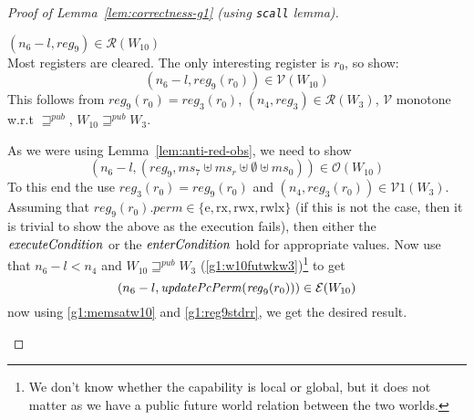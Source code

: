 \documentclass[a4paper]{article}
\newcommand{\var}[1]{\mathit{#1}}
\newcommand{\hs}{\var{ms}}
\newcommand{\ms}{\hs}
\newcommand{\reg}{\var{reg}}
\newcommand{\perm}{\var{perm}}
\newcommand{\plainfun}[2]{
  \ifthenelse{\equal{#2}{}}
  {\mathit{#1}}
  {\mathit{#1}(#2)}
}
\newcommand{\updatePcPerm}[1]{\plainfun{updatePcPerm}{#1}}
\newcommand{\execCond}[1]{\plainfun{executeCondition}{#1}}
\newcommand{\entryCond}[1]{\plainfun{enterCondition}{#1}}
\newcommand{\futurewk}{\mathbin{\sqsupseteq}^{\var{pub}}}
\newcommand{\asmType}{\plaindom{AsmType}}
\newcommand{\plaindom}[1]{\mathrm{#1}}
\newcommand{\intr}[2]{\mathcal{#1}}
\newcommand{\valueintr}[1]{\intr{V}{#1}}
\newcommand{\exprintr}[1]{\intr{E}{#1}}
\newcommand{\regintr}[1]{\intr{R}{#1}}
\newcommand{\stdvr}{\valueintr{\asmType}}
\newcommand{\stder}{\exprintr{\asmType}}
\newcommand{\stdrr}{\regintr{\asmType}}
\newcommand{\observations}{\mathcal{O}}
\newcommand{\npair}[2][n]{\left(#1,#2 \right)}
\newcommand{\plainperm}[1]{\mathrm{#1}}
\newcommand{\exec}{\plainperm{rx}}
\newcommand{\entry}{\plainperm{e}}
\newcommand{\rwx}{\plainperm{rwx}}
\newcommand{\rwlx}{\plainperm{rwlx}}
\begin{document}
\begin{proof}[Proof of Lemma~\ref{lem:correctness-g1} (using \texttt{scall} lemma)]
\begin{enumproof}[resume]
\begin{enumproof}
\begin{enumproof}
            \item $\npair[n_6-l]{\reg_9} \in \stdrr(W_{10})$ \label{g1:reg9stdrr}\\
              Most registers are cleared. The only interesting register is $r_0$, so show:
              \[
                \npair[n_6-l]{\reg_9(r_0)}\in \stdvr(W_{10})
              \]
              This follows from $\reg_9(r_0) = \reg_3(r_0)$, $\npair[n_4]{\reg_3} \in \stdrr(W_3)$, $\stdvr$ monotone w.r.t $\futurewk$, $W_{10} \futurewk W_3$.
            \end{enumproof}
            As we were using Lemma~\ref{lem:anti-red-obs}, we need to show
            \[
              \npair[n_6-l]{(reg_9,\ms_7 \uplus \ms_r \uplus \emptyset \uplus \ms_0)} \in \observations(W_{10})
            \]
            To this end the use $\reg_3(r_0) = \reg_9(r_0)$ and $\npair[n_4]{\reg_3(r_0)} \in \stdvr1(W_3)$. Assuming that $\reg_9(r_0).\perm \in \{\entry,\exec,\rwx,\rwlx \}$ (if this is not the case, then it is trivial to show the above as the execution fails), then either the $\execCond{}$ or the $\entryCond{}$ hold for appropriate values. Now use that $n_6-l < n_4$ and $W_{10} \futurewk W_3$ (\ref{g1:w10futwkw3})\footnote{We don't know whether the capability is local or global, but it does not matter as we have a public future world relation between the two worlds.} to get
            \[
              \npair[n_6-l]{\updatePcPerm{\reg_9(r_0)}} \in \stder(W_{10})
            \]
            now using \ref{g1:memsatw10} and \ref{g1:reg9stdrr}, we get the desired result.
        \end{enumproof}
  \end{enumproof}

\end{proof}
\end{document}
